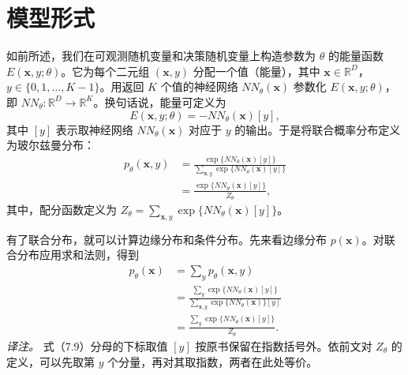 \section{模型形式}
如前所述，我们在可观测随机变量和决策随机变量上构造参数为 $\theta$ 的能量函数 $E(\mathbf{x},y;\theta)$。它为每个二元组 $(\mathbf{x},y)$ 分配一个值（能量），其中 $\mathbf{x}\in\mathbb{R}^{D}$，$y\in\{0,1,\ldots,K-1\}$。用返回 $K$ 个值的神经网络 $NN_\theta(\mathbf{x})$ 参数化 $E(\mathbf{x},y;\theta)$，即 $NN_\theta\colon\mathbb{R}^{D}\to\mathbb{R}^{K}$。换句话说，能量可定义为
\begin{equation}
E(\mathbf{x},y;\theta)=-NN_\theta(\mathbf{x})[y],
\tag{7.5}\label{eq:07-05}
\end{equation}
其中 $[y]$ 表示取神经网络 $NN_\theta(\mathbf{x})$ 对应于 $y$ 的输出。于是将联合概率分布定义为玻尔兹曼分布：
\begin{align}
p_\theta(\mathbf{x},y)&=
 \frac{\exp\{NN_\theta(\mathbf{x})[y]\}}
      {\sum_{\mathbf{x},y}\exp\{NN_\theta(\mathbf{x})[y]\}}
      \tag{7.6}\label{eq:07-06}\\
 &=\frac{\exp\{NN_\theta(\mathbf{x})[y]\}}{Z_\theta},
      \tag{7.7}\label{eq:07-07}
\end{align}
其中，配分函数定义为 $Z_\theta=\sum_{\mathbf{x},y}\exp\{NN_\theta(\mathbf{x})[y]\}$。

有了联合分布，就可以计算边缘分布和条件分布。先来看边缘分布 $p(\mathbf{x})$。对联合分布应用求和法则，得到
\begin{align}
p_\theta(\mathbf{x})&=\sum_y p_\theta(\mathbf{x},y)
                    \tag{7.8}\label{eq:07-08}\\
 &=\frac{\sum_y\exp\{NN_\theta(\mathbf{x})[y]\}}
         {\sum_{\mathbf{x},y}\exp\{NN_\theta(\mathbf{x})\}[y]}
                    \tag{7.9}\label{eq:07-09}\\
 &=\frac{\sum_y\exp\{NN_\theta(\mathbf{x})[y]\}}{Z_\theta}.
                    \tag{7.10}\label{eq:07-10}
\end{align}
\emph{译注。} 式（7.9）分母的下标取值 $[y]$ 按原书保留在指数括号外。依前文对 $Z_\theta$ 的定义，可以先取第 $y$ 个分量，再对其取指数，两者在此处等价。

